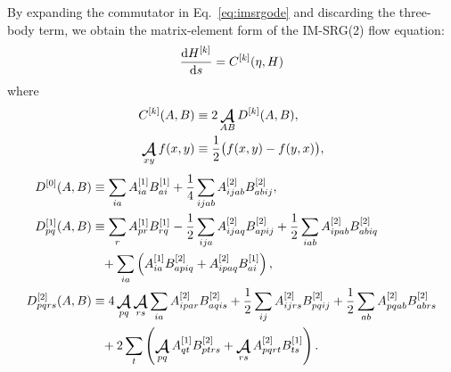 By expanding the commutator in Eq.\ \eqref{eq:imsrgode} and discarding the three-body term, we obtain the matrix-element form of the IM-SRG(2) flow equation:
\begin{align}
    \frac{\operatorname{d\!} H^{[k]}}{\operatorname{d\!} s} = C^{[k]}(\eta, H) \label{eq:flowmxe}
\end{align}
where
\begin{align}
  C^{[k]}(A, B) &\equiv 2 \antisymm_{A B} D^{[k]}(A, B), \label{eq:commutmxe} \\
  \antisymm_{x y} f(x, y) &\equiv \frac{1}{2} \bigl(f(x, y) - f(y, x)\bigr),
\end{align}
\begin{align}
  D^{[0]}(A, B)
  &\equiv
    \sum_{i a} A^{[1]}_{i a} B^{[1]}_{a i}
    + \frac{1}{4} \sum_{i j a b} A^{[2]}_{i j a b} B^{[2]}_{a b i j},
    \label{eq:flow0} \\
  D^{[1]}_{p q}(A, B)
  &\equiv
    \sum_r A^{[1]}_{p r} B^{[1]}_{r q}
    - \frac{1}{2} \sum_{i j a} A^{[2]}_{i j a q} B^{[2]}_{a p i j}
    + \frac{1}{2} \sum_{i a b} A^{[2]}_{i p a b} B^{[2]}_{a b i q}
    \notag \\
  &\hphantom{=}
    + \sum_{i a} \left(
    A^{[1]}_{i a} B^{[2]}_{a p i q}
    + A^{[2]}_{i p a q} B^{[1]}_{a i}
    \right),
    \label{eq:flow1} \\
  D^{[2]}_{p q r s}(A, B)
  &\equiv
    4 \antisymm_{p q} \antisymm_{r s} \sum_{i a} A^{[2]}_{i p a r} B^{[2]}_{a q i s}
    + \frac{1}{2} \sum_{i j} A^{[2]}_{i j r s} B^{[2]}_{p q i j}
    + \frac{1}{2} \sum_{a b} A^{[2]}_{p q a b} B^{[2]}_{a b r s}
    \notag \\
  &\hphantom{=}
    + 2 \sum_t \left(
    \antisymm_{p q} A^{[1]}_{q t} B^{[2]}_{p t r s}
    + \antisymm_{r s} A^{[2]}_{p q r t} B^{[1]}_{t s}
    \right).
    \label{eq:flow2}
\end{align}

